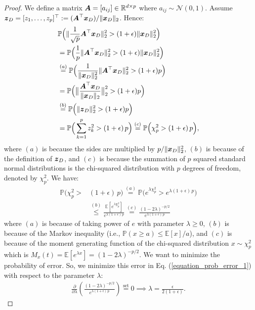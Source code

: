 \documentclass{article}
\def\b{\ensuremath\boldsymbol}
\begin{document}
\begin{proof}
We define a matrix $\b{A} = [a_{ij}] \in \mathbb{R}^{d \times p}$ where $a_{ij} \sim \mathcal{N}(0, 1)$. Assume $\b{z}_D = [z_1, \dots, z_p]^\top := (\b{A}^\top \b{x}_D) / \|\b{x}_D\|_2$. Hence:
\begin{align*}
&\mathbb{P}\Big(\|\frac{1}{\sqrt{p}}\b{A}^\top \b{x}_D\|_2^2 > (1+\epsilon) \|\b{x}_D\|_2^2\Big) \\
&= \mathbb{P}\Big(\frac{1}{p}\|\b{A}^\top \b{x}_D\|_2^2 > (1+\epsilon) \|\b{x}_D\|_2^2\Big) \\
&\overset{(a)}{=} \mathbb{P}\Big(\frac{1}{\|\b{x}_D\|_2^2} \|\b{A}^\top \b{x}_D\|_2^2 > (1+\epsilon) p\Big) \\
&= \mathbb{P}\Big(\big\|\frac{\b{A}^\top \b{x}_D}{\|\b{x}_D\|_2}\big\|_2^2 > (1+\epsilon) p\Big) \\
&\overset{(b)}{=} \mathbb{P}\Big(\|\b{z}_D\|_2^2 > (1+\epsilon) p\Big) \\
&= \mathbb{P}\Big(\sum_{k=1}^p z_k^2 > (1+\epsilon)\, p\Big) \overset{(c)}{=} \mathbb{P}\Big(\chi_p^2 > (1+\epsilon)\, p\Big),
\end{align*}
where $(a)$ is because the sides are multiplied by $p / \|\b{x}_D\|_2^2$, $(b)$ is because of the definition of $\b{z}_D$, and $(c)$ is because the summation of $p$ squared standard normal distributions is the chi-squared distribution with $p$ degrees of freedom, denoted by $\chi_p^2$. 
We have:
\begin{align}
\mathbb{P}\Big(\chi_p^2 > &(1+\epsilon)\, p\Big) \overset{(a)}{=} \mathbb{P}\Big(e^{\lambda \chi_p^2} > e^{\lambda (1+\epsilon)\, p}\Big) \nonumber\\
&\overset{(b)}{\leq} \frac{\mathbb{E}[e^{\lambda \chi_p^2}]}{e^{\lambda (1+\epsilon)\, p}} \overset{(c)}{=} \frac{(1-2\lambda)^{-p/2}}{e^{\lambda (1+\epsilon)\, p}} \label{equation_prob_error_1}
\end{align}
where $(a)$ is because of taking power of $e$ with parameter $\lambda \geq 0$, $(b)$ is because of the Markov inequality (i.e., $\mathbb{P}(x \geq a) \leq \mathbb{E}[x]/a$), and $(c)$ is because of the moment generating function of the chi-squared distribution $x \sim \chi_p^2$ which is $M_x(t) = \mathbb{E}[e^{\lambda x}] = (1-2\lambda)^{-p/2}$. 
We want to minimize the probability of error. So, we minimize this error in Eq. (\ref{equation_prob_error_1}) with respect to the parameter $\lambda$:
\begin{align*}
\frac{\partial}{\partial \lambda} (\frac{(1-2\lambda)^{-p/2}}{e^{\lambda (1+\epsilon)\, p}}) \overset{\text{set}}{=} 0 \implies \lambda = \frac{\epsilon}{2(1+\epsilon)}.

\end{align*}
\end{proof}
\end{document}
